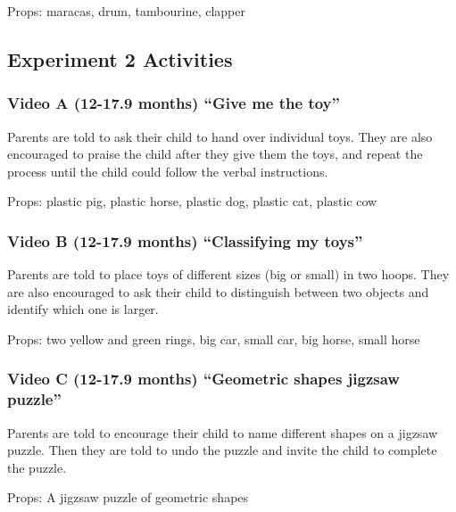 \documentclass[man,floatsintext]{apa6}
\begin{document}
\begin{appendix}
Props: maracas, drum, tambourine, clapper

\hypertarget{experiment-2-activities}{%
\subsection{Experiment 2 Activities}\label{experiment-2-activities}}

\hypertarget{video-a-12-17.9-months-give-me-the-toy}{%
\subsubsection{Video A (12-17.9 months) ``Give me the
toy''}\label{video-a-12-17.9-months-give-me-the-toy}}

Parents are told to ask their child to hand over individual toys. They
are also encouraged to praise the child after they give them the toys,
and repeat the process until the child could follow the verbal
instructions.

Props: plastic pig, plastic horse, plastic dog, plastic cat, plastic cow

\hypertarget{video-b-12-17.9-months-classifying-my-toys}{%
\subsubsection{Video B (12-17.9 months) ``Classifying my
toys''}\label{video-b-12-17.9-months-classifying-my-toys}}

Parents are told to place toys of different sizes (big or small) in two
hoops. They are also encouraged to ask their child to distinguish
between two objects and identify which one is larger.

Props: two yellow and green rings, big car, small car, big horse, small
horse

\hypertarget{video-c-12-17.9-months-geometric-shapes-jigzsaw-puzzle}{%
\subsubsection{Video C (12-17.9 months) ``Geometric shapes jigzsaw
puzzle''}\label{video-c-12-17.9-months-geometric-shapes-jigzsaw-puzzle}}

Parents are told to encourage their child to name different shapes on a
jigzsaw puzzle. Then they are told to undo the puzzle and invite the
child to complete the puzzle.

Props: A jigzsaw puzzle of geometric shapes

\hypertarget{video-d-18-23.9-months-my-toys}{%
}
\end{appendix}
\end{document}
